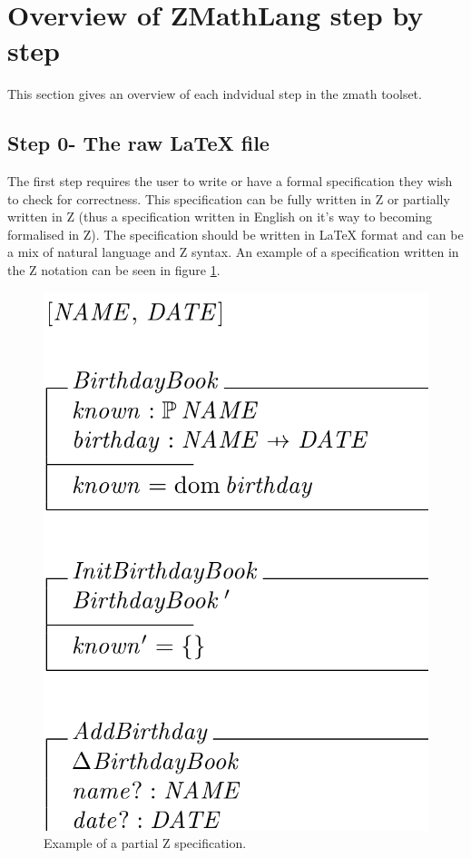 \section{Overview of ZMathLang step by step}

This section gives an overview of each indvidual step in the \gls{zmath}
toolset.

\subsection{Step 0- The raw LaTeX file}

The first step requires the user to write or have a formal specification they
wish to check for correctness. This specification can be fully written in Z or
partially written in Z (thus a specification written in English on it's way to
becoming formalised in Z). The specification should be written in \LaTeX{}
format and can be a mix of natural language and Z syntax. An example of a
specification written in the Z notation can be seen in figure
\ref{fig:zexample}.

\begin{figure}[H]
 \begin{center}
 \includegraphics [scale=0.25]{Figures/Design/zspec.png}
 \caption{Example of a partial Z specification.}
 \label{fig:zexample}
\end{center}
\end{figure} 

